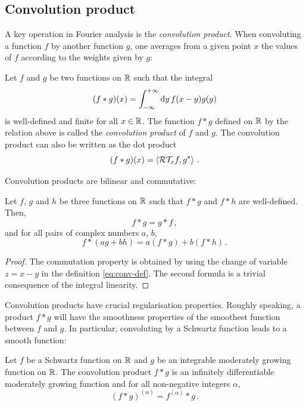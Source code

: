 \subsection{Convolution product}
A key operation in Fourier analysis is the \emph{convolution product}. When convoluting a
function $f$ by another function $g$, one averages from a given point $x$ the values of
$f$ according to the weights given by $g$:
\begin{definition}
	Let $f$ and $g$ be two functions on $\mathbb{R}$ such that the integral
	\begin{equation}
		(f\ast g)(x)=\int_{-\infty}^{+\infty}\mathrm{d}{y}\,f(x-y)g(y)\label{eq:conv-def}
	\end{equation}
	is well-defined and finite for all $x\in\mathbb{R}$. The function $f\ast g$ defined on $\mathbb{R}$ by
	the relation above is called the \emph{convolution product} of $f$ and $g$. The
	convolution product can also be written as the dot product
	\begin{equation}
		(f\ast g)(x)=\braket{\mathcal{R}\mathcal{T}_xf,g^*}\,.
	\end{equation}
\end{definition}
Convolution products are bilinear and commutative:
\begin{proposition}
	Let $f$, $g$ and $h$ be three functions on $\mathbb{R}$ such that $f\ast g$ and $f\ast h$ are
	well-defined. Then,
	\begin{equation}
		f\ast g=g\ast f\,,
	\end{equation}
	and for all pairs of complex numbers $a$, $b$,
	\begin{equation}
		f\ast (ag+bh)=a(f\ast g) + b(f\ast h)\,.
	\end{equation}
\end{proposition}
\begin{proof}
	The commutation property is obtained by using the change of variable $z=x-y$ in the
	definition \cref{eq:conv-def}. The second formula is a trivial consequence of the
	integral linearity.
\end{proof}
Convolution products have crucial regularisation properties. Roughly speaking, a product
$f\ast g$ will have the smoothness properties of the smoothest function between $f$ and
$g$. In particular, convoluting by a Schwartz function leads to a smooth function:
\begin{theorem}
	Let $f$ be a Schwartz function on $\mathbb{R}$ and $g$ be an integrable moderately growing
	function on $\mathbb{R}$. The convolution product $f\ast g$ is an infinitely differentiable
	moderately growing function and for all non-negative integers $\alpha$,
	\begin{equation}
		(f\ast g)^{(\alpha)}=f^{(\alpha)}\ast g\,.
	\end{equation}
\end{theorem}
